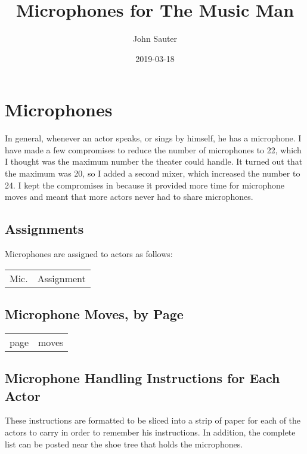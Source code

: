 \documentclass[letterpaper]{article}
\title{Microphones for The Music Man}
\author{John Sauter}
\date{2019-03-18}
\begin{document}
\maketitle
\tableofcontents
\newpage

\section {Microphones}
In general, whenever an actor speaks, or sings by himself, he has a microphone.
I have made a few compromises to reduce the number of microphones to 22,
which I thought was the maximum number the theater could handle.
It turned out that the maximum was 20, so I added a second mixer, which
increased the number to 24.  I kept the compromises in because it
provided more time for microphone moves and meant that more actors
never had to share microphones.

\subsection {Assignments}
Microphones are assigned to actors as follows:

\begin{center}
\begin{longtable}{|l|m{7in}|}
\hline Mic. & Assignment \endhead \hline

\end{longtable}
\end{center}

\subsection {Microphone Moves, by Page}

\begin{center}
\begin{longtable}{|l|m{7in}|}
\hline page & moves \endhead \hline

\end{longtable}
\end{center}

\subsection {Microphone Handling Instructions for Each Actor}

These instructions are formatted to be sliced into a strip of paper
for each of the actors to carry in order to remember his instructions.
In addition, the complete list can be posted near the shoe tree that
holds the microphones.
\end{document}
